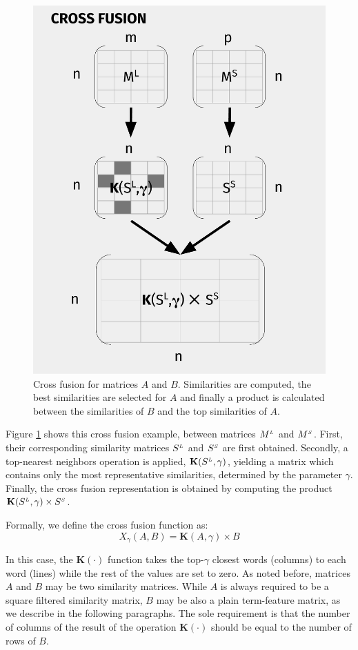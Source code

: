 \begin{figure}
\centering
\includegraphics[width=0.6\linewidth]{images/Chapitre3/xf_diag.pdf}
\caption{Cross fusion for matrices $A$ and $B$. Similarities are computed, the best similarities are selected for $A$ and finally a product is calculated between the similarities of $B$ and the top similarities of $A$.}
\label{fig:xf_diag}
\end{figure}

Figure \ref{fig:xf_diag} shows this cross fusion example, between matrices $M^{\scriptscriptstyle L}$ and $M^{\scriptscriptstyle S}$. First, their corresponding similarity matrices $S^{\scriptscriptstyle L}$ and $S^{\scriptscriptstyle S}$ are first obtained. Secondly, a  top-nearest neighbors operation is applied, $\mathbf{K}(S^{\scriptscriptstyle L}, \gamma)$, yielding a matrix which contains only the most representative similarities, determined by the parameter $\gamma$. Finally, the cross fusion representation is obtained by computing the product $\mathbf{K}(S^{\scriptscriptstyle L}, \gamma) \times S^{\scriptscriptstyle S}$.

Formally, we define the cross fusion function as:
\begin{equation}\label{eq:xfusion}
X_{\gamma}(A,B) = \mathbf{K}(A,\gamma) \times B
\end{equation}

In this case, the $\mathbf{K}(\cdot)$ function takes the top-$\gamma$ closest words (columns) to each word (lines) while the rest of the values are set to zero. As noted before, matrices $A$ and $B$ may be two similarity matrices. While $A$ is always required to be a square filtered similarity matrix, $B$ may be also a plain term-feature matrix, as we describe in the following paragraphs.
The sole requirement is that the  number of columns of the result of the operation $\mathbf{K}(\cdot)$ should be equal to the number of rows of $B$.

